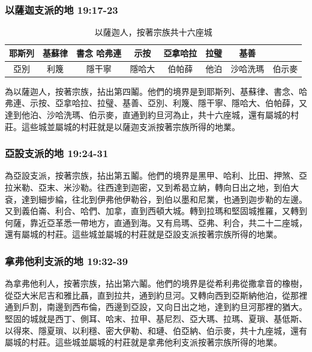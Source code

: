 \subsubsection{以薩迦支派的地 19:17-23}
\begin{table}[H]
\centering
\begin{tabular}{|c|c|c|c|c|c|c|c|}
\hline
\hline
耶斯列&基蘇律&書念 哈弗連&示按&亞拿哈拉 &拉璧&基善\\\hline
亞別&利篾&隱干寧&隱哈大&伯帕薛&他泊&沙哈洗瑪&伯示麥 \\\hline
\end{tabular}
\caption{以薩迦人，按著宗族共十六座城}
\end{table}
為以薩迦人，按著宗族，拈出第四鬮。他們的境界是到耶斯列、基蘇律、書念、哈弗連、示按、亞拿哈拉、拉璧、基善、亞別、利篾、隱干寧、隱哈大、伯帕薛，又達到他泊、沙哈洗瑪、伯示麥，直通到約旦河為止，共十六座城，還有屬城的村莊。這些城並屬城的村莊就是以薩迦支派按著宗族所得的地業。

\subsubsection{亞設支派的地 19:24-31}
為亞設支派，按著宗族，拈出第五鬮。他們的境界是黑甲、哈利、比田、押煞、亞拉米勒、亞末、米沙勒。往西達到迦密，又到希曷立納，轉向日出之地，到伯大袞，達到細步綸，往北到伊弗他伊勒谷，到伯以墨和尼業，也通到迦步勒的左邊。又到義伯崙、利合、哈們、加拿，直到西頓大城。轉到拉瑪和堅固城推羅，又轉到何薩，靠近亞革悉一帶地方，直通到海。又有烏瑪、亞弗、利合，共二十二座城，還有屬城的村莊。這些城並屬城的村莊就是亞設支派按著宗族所得的地業。

\subsubsection{拿弗他利支派的地 19:32-39}
為拿弗他利人，按著宗族，拈出第六鬮。他們的境界是從希利弗從撒拿音的橡樹，從亞大米尼吉和雅比聶，直到拉共，通到約旦河。又轉向西到亞斯納他泊，從那裡通到戶割，南邊到西布倫，西邊到亞設，又向日出之地，達到約旦河那裡的猶大。堅固的城就是西丁、側耳、哈末、拉甲、基尼烈、亞大瑪、拉瑪、夏瑣、基低斯、以得來、隱夏瑣、以利穩、密大伊勒、和璉、伯亞納、伯示麥，共十九座城，還有屬城的村莊。這些城並屬城的村莊就是拿弗他利支派按著宗族所得的地業。

